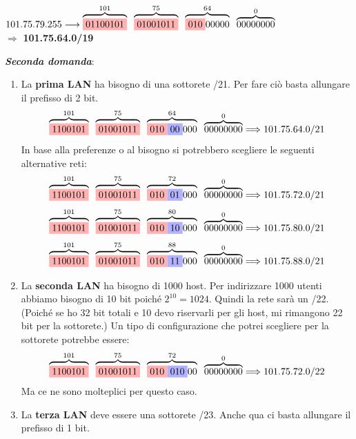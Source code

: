 \documentclass[a4paper]{article}
\begin{document}
\begin{center}
$101.75.79.255 \longrightarrow \overbrace{\colorbox{red!30!white}{01100101}}^{101} \; \; \overbrace{\colorbox{red!30!white}{01001011}}^{75} \; \; \overbrace{\colorbox{red!30!white}{010}00000}^{64} \; \; \overbrace{00000000}^{0}$\\
$\Longrightarrow$ \textbf{101.75.64.0/19}
\end{center}
\textbf{\textit{Seconda domanda}}:
\begin{enumerate}
\item La \textbf{prima LAN} ha bisogno di una sottorete /21. Per fare ciò basta allungare il prefisso di 2 bit. 
\[\overbrace{\colorbox{red!30!white}{1100101}}^{101} \; \; \overbrace{\colorbox{red!30!white}{01001011}}^{75} \; \; \overbrace{\colorbox{red!30!white}{010}\colorbox{blue!30!white}{00}000}^{64} \; \; \overbrace{00000000}^{0} \Longrightarrow 101.75.64.0/21\]
In base alla preferenze o al bisogno si potrebbero scegliere le seguenti alternative reti:
\[\overbrace{\colorbox{red!30!white}{1100101}}^{101} \; \; \overbrace{\colorbox{red!30!white}{01001011}}^{75} \; \; \overbrace{\colorbox{red!30!white}{010}\colorbox{blue!30!white}{01}000}^{72} \; \; \overbrace{00000000}^{0} \Longrightarrow 101.75.72.0/21\]
\[\overbrace{\colorbox{red!30!white}{1100101}}^{101} \; \; \overbrace{\colorbox{red!30!white}{01001011}}^{75} \; \; \overbrace{\colorbox{red!30!white}{010}\colorbox{blue!30!white}{10}000}^{80} \; \; \overbrace{00000000}^{0} \Longrightarrow 101.75.80.0/21\]
\[\overbrace{\colorbox{red!30!white}{1100101}}^{101} \; \; \overbrace{\colorbox{red!30!white}{01001011}}^{75} \; \; \overbrace{\colorbox{red!30!white}{010}\colorbox{blue!30!white}{11}000}^{88} \; \; \overbrace{00000000}^{0} \Longrightarrow 101.75.88.0/21\]
\item La \textbf{seconda LAN }ha bisogno di 1000 host. Per indirizzare 1000 utenti abbiamo bisogno di 10 bit poiché $2^{10} = 1024$. Quindi la rete sarà un /22. (Poiché se ho 32 bit totali e 10 devo riservarli per gli host, mi rimangono 22 bit per la sottorete.) Un tipo di configurazione che potrei scegliere per la sottorete potrebbe essere:
\[\overbrace{\colorbox{red!30!white}{1100101}}^{101} \; \; \overbrace{\colorbox{red!30!white}{01001011}}^{75} \; \; \overbrace{\colorbox{red!30!white}{010}\colorbox{blue!30!white}{010}00}^{72} \; \; \overbrace{00000000}^{0} \Longrightarrow 101.75.72.0/22\]
Ma ce ne sono molteplici per questo caso.
\item La \textbf{terza LAN} deve essere una sottorete /23. Anche qua ci basta allungare il prefisso di 1 bit.

\end{enumerate}
\end{document}
